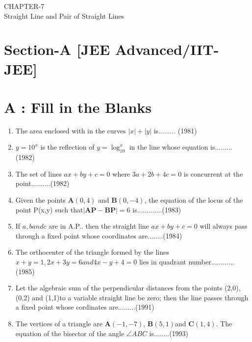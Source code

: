 \documentclass[12pt]{article}
\let\vec\mathbf
\begin{document}
\begin{center}
\textbf\large{CHAPTER-7 \\ Straight Line and Pair of Straight Lines}

\end{center}


\section*{Section-A    [JEE Advanced/IIT-JEE]}
\section*{A    :  Fill in the Blanks}
\begin{enumerate}

\item  The area enclosed with in the curves $|x|+|y|$ is.........  (1981) \\
\item  $y=10^x$ is the reflection of $y=\log_10^x $ in the line whose equation is.........(1982)\\
\item The set of lines $ax+by+c=0$ where $3a+2b+4c=0$ is concurrent at the point..........(1982)\\
\item  Given the points $\vec{A}(0,4)$ and $\vec{B}(0,-4)$, the equation of the locus of the point P(x,y) such that$|\vec{AP}-\vec{BP}|=6$ is.............(1983)\\
\item  If $a,b and c$ are in A.P.. then the straight line $ax+by+c=0$ will always pass through a fixed point whose coordinates are........(1984)\\
\item  The orthocenter of the triangle formed by the lines $x+y=1, 2x+3y=6  and  4x-y+4=0$ lies in quadrant number............(1985)\\
\item Let the algebraic sum of the perpendicular distances from the points (2,0), (0,2) and (1,1)to a variable straight line be zero; then the line passes through a fixed point whose cordinates are.........(1991)\\
\item The vertices of a triangle are $\vec{A}(-1,-7)$, $\vec{B}(5,1)$and $\vec{C}(1,4)$. The equation of the bisector of the angle $\angle{ABC}$ is........(1993)

\end{enumerate}
\end{document}
